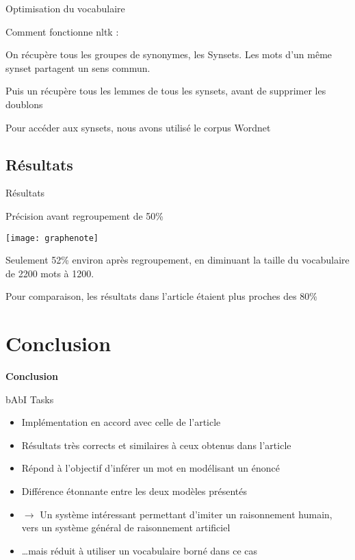 \documentclass{beamer}
\theoremstyle{definition}
\begin{document}
\begin{frame}{Optimisation du vocabulaire}
 
 Comment fonctionne nltk :
 
 \vspace{0.5cm}
 On récupère tous les groupes de synonymes, les Synsets. Les mots d'un même synset partagent un sens commun.
 
 Puis un récupère tous les lemmes de tous les synsets, avant de supprimer les doublons
 
 \vspace{0.5cm}
 Pour accéder aux synsets, nous avons utilisé le corpus Wordnet
\end{frame}

\subsection{Résultats}

\begin{frame}{Résultats}

Précision avant regroupement de 50\%
\begin{center}
\texttt{[image: graphenote]}
\end{center}

\vspace{0.5cm}
Seulement 52\% environ après regroupement, en diminuant la taille du vocabulaire de 2200 mots à 1200.

Pour comparaison, les résultats dans l'article étaient plus proches des 80\%
  
\end{frame}

\section{Conclusion}

\begin{frame}

\centering \textbf{Conclusion}
\end{frame}	

\begin{frame}{bAbI Tasks}

\begin{itemize}
\item Implémentation en accord avec celle de l'article\cite{1}
\item Résultats très corrects et similaires à ceux obtenus dans l'article\cite{1}
\item Répond à l'objectif d'inférer un mot en modélisant un énoncé
\item Différence étonnante entre les deux modèles présentés
\item $\rightarrow$ Un système intéressant permettant d'imiter un raisonnement humain, vers un système général de raisonnement artificiel
\item \ldots mais réduit à utiliser un vocabulaire borné dans ce cas
\end{itemize}
  
\end{frame}
\end{document}
